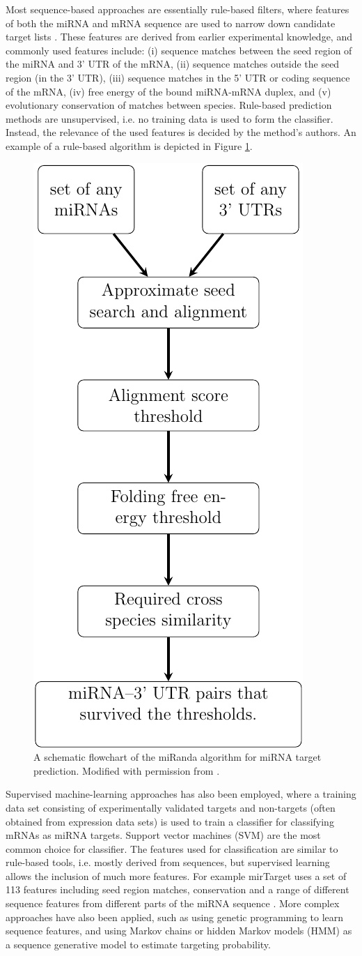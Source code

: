 Most sequence-based approaches are essentially rule-based filters, where
features of both the miRNA and mRNA sequence are used to narrow down candidate
target lists \citep{Yue2009}. These features are derived from earlier
experimental knowledge, and commonly used features include:
(i) sequence matches between the seed region of the miRNA and 3' UTR of the mRNA,
(ii) sequence matches outside the seed region (in the 3' UTR),
(iii) sequence matches in the 5' UTR or coding sequence of the mRNA,
(iv) free energy of the bound miRNA-mRNA duplex, and
(v) evolutionary conservation of matches between species.
Rule-based prediction methods are unsupervised, i.e. no training data is
used to form the classifier. Instead, the relevance of the used features is
decided by the method's authors. An example of a rule-based algorithm
is depicted in Figure \ref{fig:miranda-flow}.

\begin{figure}[htb]
  \centering
  \includegraphics[width=0.3\linewidth]{figures/miRanda-flow.pdf}
  \caption{A schematic flowchart of the miRanda \citep{Betel2008} algorithm for
  miRNA target prediction. Modified with permission from \citep{Karhu2009}.}
  \label{fig:miranda-flow}
\end{figure}



Supervised machine-learning approaches has also been employed, where a
training data set consisting of experimentally validated targets and non-targets
(often obtained from expression data sets) is used to train a
classifier for classifying mRNAs as miRNA targets. Support vector machines (SVM)
are the most common choice for classifier. The features used for classification
are similar to rule-based tools, i.e. mostly derived from sequences, but supervised
learning allows the inclusion of much more features. For example mirTarget
uses a set of 113 features including seed region matches, conservation and a
range of different sequence features from different parts of the miRNA
sequence \citep{Wang2008}. More complex approaches have also been applied,
such as using genetic programming to learn sequence features, and using
Markov chains or hidden Markov models (HMM) as a sequence
generative model to estimate targeting probability.

